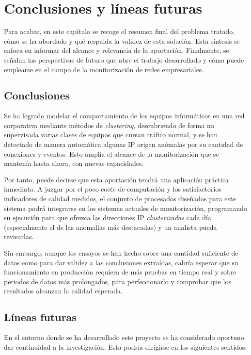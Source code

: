 \chapter{Conclusiones y líneas futuras}\label{chap:conclusiones}

Para acabar, en este capítulo se recoge el resumen final del problema tratado, cómo se ha abordado y qué respalda la validez de esta solución.
Esta síntesis se enfoca en informar del alcance y relevancia de la aportación.
Finalmente, se señalan las perspectivas de futuro que abre el trabajo desarrollado y cómo puede emplearse en el campo de la monitorización de redes empresariales.

\section{Conclusiones}\label{sec:conclusiones}

Se ha logrado modelar el comportamiento de los equipos informáticos en una red corporativa mediante métodos de \emph{clustering},
descubriendo de forma no supervisada varias clases de equipos que cursan tráfico normal,
y se han detectado de manera automática algunas IP origen anómalas por su cantidad de conexiones y eventos.
Esto amplía el alcance de la monitorización que se mantenía hasta ahora, con nuevas capacidades.

Por tanto, puede decirse que esta aportación tendrá una aplicación práctica inmediata.
A juzgar por el poco coste de computación y los satisfactorios indicadores de calidad medidos,
el conjunto de procesados diseñados para este sistema podrá integrarse en los sistemas actuales de monitorización,
programando su ejecución para que ofrezca las direcciones IP \emph{clusterizadas} cada día (especialmente el de las anomalías más destacadas) y un analista pueda revisarlas.

Sin embargo, aunque los ensayos se han hecho sobre una cantidad suficiente de datos como para dar validez a las conclusiones extraídas,
cabría esperar que su funcionamiento en producción requiera de más pruebas en tiempo real y sobre periodos de datos más prolongados,
para perfeccionarlo y comprobar que los resultados alcanzan la calidad esperada.

\section{Líneas futuras}\label{sec:lineasfuturas}

En el entorno donde se ha desarrollado este proyecto se ha considerado oportuno dar continuidad a la investigación.
Esta podría dirigirse en los siguientes sentidos:


